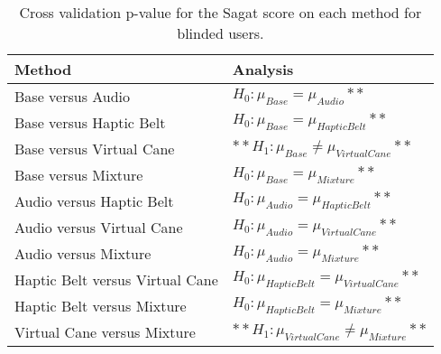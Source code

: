 
\begin{table}[!htb]
\centering
\caption{Cross validation p-value for the Sagat score on each method for blinded users.}
\label{tab:lsd_sagat_avg}
\begin{tabular}{ll}
\toprule
                         Method &                                      Analysis \\
\midrule
              Base versus Audio &               $H_{0} : \mu_{Base} = \mu_{Audio}**$ \\
        Base versus Haptic Belt &         $H_{0} : \mu_{Base} = \mu_{Haptic Belt}**$ \\
       Base versus Virtual Cane &      $**H_{1} : \mu_{Base} \ne \mu_{Virtual Cane}**$ \\
            Base versus Mixture &             $H_{0} : \mu_{Base} = \mu_{Mixture}**$ \\
       Audio versus Haptic Belt &        $H_{0} : \mu_{Audio} = \mu_{Haptic Belt}**$ \\
      Audio versus Virtual Cane &       $H_{0} : \mu_{Audio} = \mu_{Virtual Cane}**$ \\
           Audio versus Mixture &            $H_{0} : \mu_{Audio} = \mu_{Mixture}**$ \\
Haptic Belt versus Virtual Cane & $H_{0} : \mu_{Haptic Belt} = \mu_{Virtual Cane}**$ \\
     Haptic Belt versus Mixture &      $H_{0} : \mu_{Haptic Belt} = \mu_{Mixture}**$ \\
    Virtual Cane versus Mixture &   $**H_{1} : \mu_{Virtual Cane} \ne \mu_{Mixture}**$ \\
\bottomrule
\end{tabular}
\end{table}

